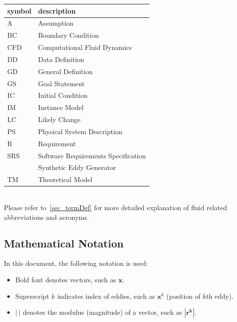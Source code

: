 \documentclass[12pt]{article}
\begin{document}
\renewcommand{\arraystretch}{1.2}
\begin{tabular}{l l} 
  \toprule		
  \textbf{symbol} & \textbf{description}\\
  \midrule 
  A & Assumption\\
  BC & Boundary Condition\\
  CFD & Computational Fluid Dynamics\\
  DD & Data Definition\\
  GD & General Definition\\
  GS & Goal Statement\\
  IC & Initial Condition\\
  IM & Instance Model\\
  LC & Likely Change\\
  PS & Physical System Description\\
  R & Requirement\\
  SRS & Software Requirements Specification\\
  \progname{} & Synthetic Eddy Generator\\
  TM & Theoretical Model\\
  \bottomrule
\end{tabular}\\

Please refer to~\ref{sec_termDef} for more detailed explanation of fluid related abbreviations and acronyms.

\subsection{Mathematical Notation}
In this document, the following notation is used:
\begin{itemize}
  \item Bold font denotes vectors, such as $\mathbf{x}$.
  \item Superscript $k$ indicates index of eddies, such as $\mathbf{x}^k$ (position of $k$th eddy).
  \item $|~|$ denotes the modulus (magnitude) of a vector, such as $|\mathbf{r^k}|$.
\end{itemize}

\end{document}
